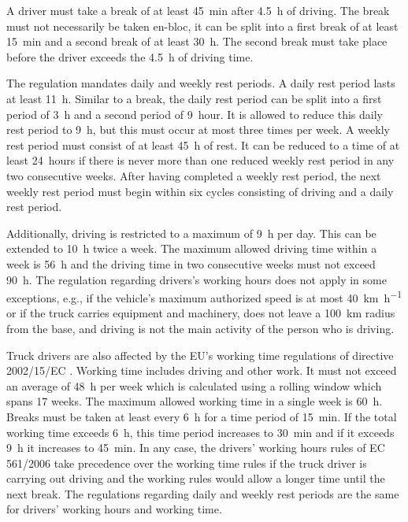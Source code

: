 A driver must take a break of at least \SI{45}{\minute} after \SI{4.5}{\hour} of driving. The break must not necessarily be taken en-bloc, it can be split into a first break of at least \SI{15}{\minute} and a second break of at least \SI{30}{\hour}. The second break must take place before the driver exceeds the \SI{4.5}{\hour} of driving time.

The regulation mandates daily and weekly rest periods. A daily rest period lasts at least \SI{11}{\hour}. Similar to a break, the daily rest period can be split into a first period of \SI{3}{\hour} and a second period of \SI{9}{hour}. It is allowed to reduce this daily rest period to \SI{9}{\hour}, but this must occur at most three times per week. A weekly rest period must consist of at least \SI{45}{\hour} of rest. It can be reduced to a time of at least \SI{24}{hours} if there is never more than one reduced weekly rest period in any two consecutive weeks. After having completed a weekly rest period, the next weekly rest period must begin within six cycles consisting of driving and a daily rest period.

Additionally, driving is restricted to a maximum of \SI{9}{\hour} per day. This can be extended to \SI{10}{\hour} twice a week. The maximum allowed driving time within a week is \SI{56}{\hour} and the driving time in two consecutive weeks must not exceed \SI{90}{\hour}. The regulation regarding drivers's working hours does not apply in some exceptions, e.g., if the vehicle's maximum authorized speed is at most \SI[per-mode = symbol]{40}{\kilo\meter\per\hour} or if the truck carries equipment and machinery, does not leave a \SI{100}{\kilo\meter} radius from the base, and driving is not the main activity of the person who is driving.

Truck drivers are also affected by the EU's working time regulations of directive 2002/15/EC \cite{europeanparliament:2002}. Working time includes driving and other work. It must not exceed an average of \SI{48}{\hour} per week which is calculated using a rolling window which spans 17 weeks. The maximum allowed working time in a single week is \SI{60}{\hour}. Breaks must be taken at least every \SI{6}{\hour} for a time period of \SI{15}{\minute}. If the total working time exceeds \SI{6}{\hour}, this time period increases to \SI{30}{\minute} and if it exceeds \SI{9}{\hour} it increases to \SI{45}{\minute}. In any case, the drivers' working hours rules of EC 561/2006 take precedence over the working time rules if the truck driver is carrying out driving and the working rules would allow a longer time until the next break. The regulations regarding daily and weekly rest periods are the same for drivers' working hours and working time.

